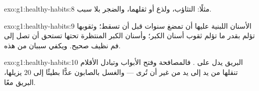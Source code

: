 \begin{solution}{exo:g1:healthy-habits:8}
مثلًا: التثاؤب، ولذع  أو ثقلهما، والضجر بلا سبب.
\end{solution}

\begin{solution}{exo:g1:healthy-habits:9}
الأسنان اللبنية عليها أن تمضغ سنوات قبل أن تسقط؛ وثقوبها تؤلم
بقدر ما تؤلم ثقوب أسنان الكبر؛ وأسنان الكبر المنتظرة تحتها تستحق
أن تصل إلى فم نظيف صحيح. ويكفي سببان من هذه.
\end{solution}

\begin{solution}{exo:g1:healthy-habits:10}
البريق يدل على . فالمصافحة وفتح الأبواب وتبادل الأقلام
تنقلها من يد إلى يد من غير أن تُرى --- والغسل بالصابون عدًّا بطيئًا
إلى $20$ يزيلها، البريق  معًا.
\end{solution}
